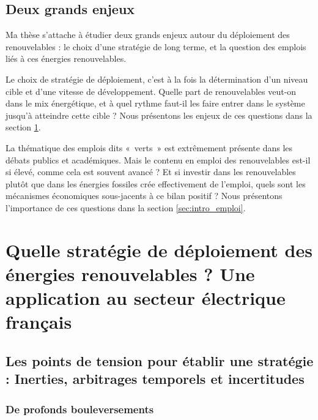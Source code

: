 \subsection{Deux grands enjeux}
Ma thèse s’attache à étudier deux grands enjeux autour du déploiement des renouvelables : le choix d’une stratégie de long terme, et la question des emplois liés à ces énergies renouvelables.

Le choix de stratégie de déploiement, c’est à la fois la détermination d’un niveau cible et d’une vitesse de développement. Quelle part de renouvelables veut-on dans le mix énergétique, et à quel rythme faut-il les faire entrer dans le système jusqu’à atteindre cette cible ? 
Nous présentons les enjeux de ces questions dans la section \ref{sec:intro_renouvelables}.

La thématique des emplois dits «~verts~» est extrêmement présente dans les débats publics et académiques. Mais le contenu en emploi des renouvelables est-il si élevé, comme cela est souvent avancé ? Et si investir dans les renouvelables plutôt que dans les énergies fossiles crée effectivement de l’emploi, quels sont les mécanismes économiques sous-jacents à ce bilan positif ? Nous présentons l’importance de ces questions dans la section \ref{sec:intro_emploi}.



\section{Quelle stratégie de déploiement des énergies renouvelables ? Une application au secteur électrique français}

\label{sec:intro_renouvelables}

\subsection{Les points de tension pour établir une stratégie : Inerties, arbitrages temporels et incertitudes}

\subsubsection{De profonds bouleversements}

